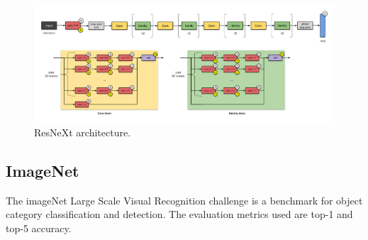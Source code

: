 \begin{figure}[htb]
    \centering
    \includegraphics[scale = 0.23]{Sections/2StateOfTheArt/2_images/resnext.png}
    \caption{ResNeXt architecture. \cite{cnnarchitectures} }
    \label{fig:noisestudent}
\end{figure}


\newpage

\subsection{ImageNet}
\par The imageNet Large Scale Visual Recognition challenge \cite{Russakovsky2015} is a benchmark for object category classification and detection. The evaluation metrics used are top-1 and top-5 accuracy.

